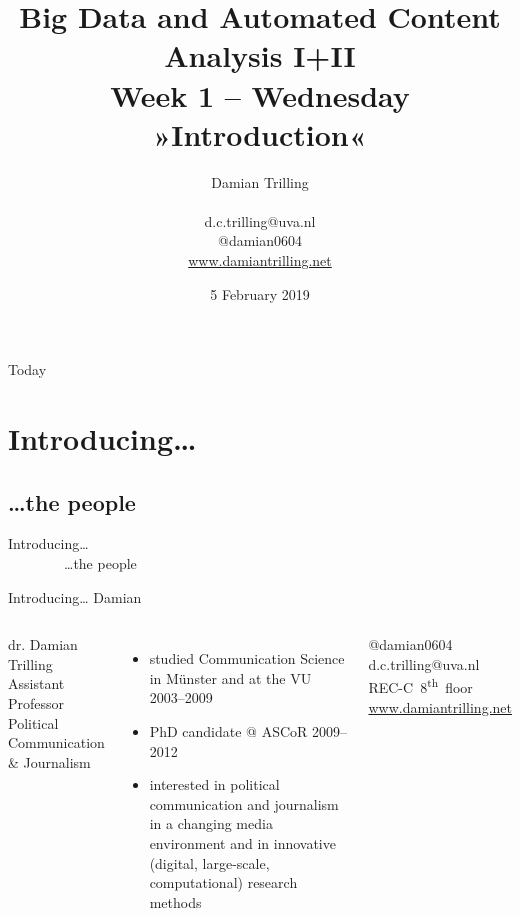 \documentclass{beamer}
\begin{document}
\title[Big Data and Automated Content Analysis]{\textbf{Big Data and Automated Content Analysis I+II} \\ Week 1 -- Wednesday \\ »Introduction«}
\author[Damian Trilling]{Damian Trilling \\ ~ \\ \footnotesize{d.c.trilling@uva.nl \\@damian0604} \\ \url{www.damiantrilling.net}}
\date{5 February 2019}


\begin{frame}{}
\titlepage
\end{frame}

\begin{frame}{Today}
\tableofcontents
\end{frame}



\section{Introducing\ldots}
\subsection{\ldots the people}

\begin{frame}
	Introducing\ldots \\
	~~~~~~~~\ldots the people
\end{frame}

\begin{frame}{Introducing\ldots}
	{\huge{Damian}}
	\small{}
	\begin{columns}
		dr. Damian Trilling \\
		Assistant Professor Political Communication \& Journalism \\
		\begin{itemize}
			\item studied Communication Science in M\"unster and at the VU 2003--2009
			\item PhD candidate @ ASCoR 2009--2012
			\item interested in political communication and journalism in a changing media environment and in innovative (digital, large-scale, computational) research methods
		\end{itemize}
		@damian0604 ~~ d.c.trilling@uva.nl ~~ REC-C~8\textsuperscript{th}~floor ~~ \url{www.damiantrilling.net} 
	\end{columns}
\end{frame}
\end{document}
